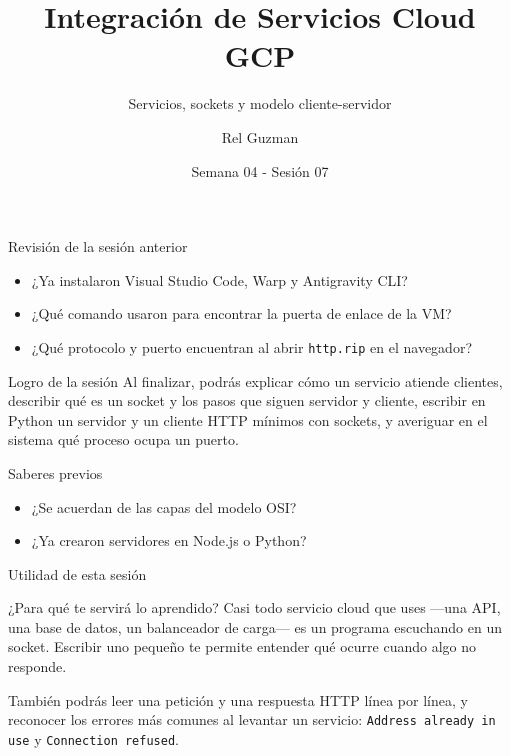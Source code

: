 \documentclass[aspectratio=169,10pt,c]{beamer}
\title{Integración de Servicios Cloud GCP}
\subtitle{Servicios, sockets y modelo cliente-servidor}
\date{Semana 04 - Sesión 07}
\author{Rel Guzman}
\begin{document}
{\maketitle}

\begin{frame}{Revisión de la sesión anterior}
\begin{itemize}\setlength\itemsep{10pt}
  \item ¿Ya instalaron Visual Studio Code, Warp y Antigravity CLI?
  \item ¿Qué comando usaron para encontrar la puerta de enlace de la VM?
  \item ¿Qué protocolo y puerto encuentran al abrir \texttt{http.rip} en el navegador?
\end{itemize}
\end{frame}

\begin{frame}[c]
\begin{block}{Logro de la sesión}
Al finalizar, podrás explicar cómo un servicio atiende clientes, describir qué es un socket y los pasos que siguen servidor y cliente, escribir en Python un servidor y un cliente HTTP mínimos con sockets, y averiguar en el sistema qué proceso ocupa un puerto.
\end{block}
\end{frame}

\begin{frame}{Saberes previos}
\begin{itemize}\setlength\itemsep{10pt}
  \item ¿Se acuerdan de las capas del modelo OSI?
  \item ¿Ya crearon servidores en Node.js o Python?
\end{itemize}
\end{frame}

\begin{frame}{Utilidad de esta sesión}
\begin{block}{¿Para qué te servirá lo aprendido?}
Casi todo servicio cloud que uses —una API, una base de datos, un balanceador de carga— es un programa escuchando en un socket. Escribir uno pequeño te permite entender qué ocurre cuando algo no responde.
\end{block}
\vspace{0.2cm}
\small También podrás leer una petición y una respuesta HTTP línea por línea, y reconocer los errores más comunes al levantar un servicio: \texttt{Address already in use} y \texttt{Connection refused}.
\end{frame}
\end{document}
